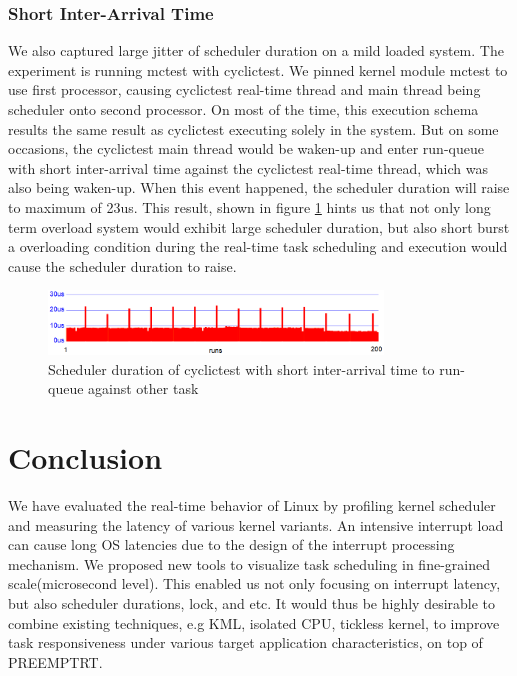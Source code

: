 \documentclass[conference]{IEEEtran}
\begin{document}
\subsubsection{Short Inter-Arrival Time}

    We also captured large jitter of scheduler duration on a mild loaded system. The experiment is running mctest with
    cyclictest. We pinned kernel module mctest to use first processor, causing cyclictest real-time thread and main
    thread being scheduler onto second processor. On most of the time, this execution schema results the same result as
    cyclictest executing solely in the system. But on some occasions, the cyclictest main thread would be waken-up and
    enter run-queue with short inter-arrival time against the cyclictest real-time thread, which was also being
    waken-up. When this event happened, the scheduler duration will raise to maximum of 23us. This result, shown in
    figure \ref{fig:sd_mctest} hints us that not only long term overload system would exhibit large scheduler duration,
    but also short burst a overloading condition during the real-time task scheduling and execution would cause the
    scheduler duration to raise.

    \begin{figure} \centering \includegraphics[width=3.5in]{img/sd-mctest.png} \caption{Scheduler duration of cyclictest
    with short inter-arrival time to run-queue against other task} \label{fig:sd_mctest} \end{figure}

\section{Conclusion}

    We have evaluated the real-time behavior of Linux by profiling kernel scheduler and measuring the latency of various
    kernel variants. An intensive interrupt load can cause long OS latencies due to the design of the interrupt
    processing mechanism. We proposed new tools to visualize task scheduling in fine-grained scale(microsecond level).
    This enabled us not only focusing on interrupt latency, but also scheduler durations, lock, and etc. It would thus
    be highly desirable to combine existing techniques, e.g KML, isolated CPU, tickless kernel, to improve task
    responsiveness under various target application characteristics, on top of PREEMPT\textunderscore RT.



\end{document}
